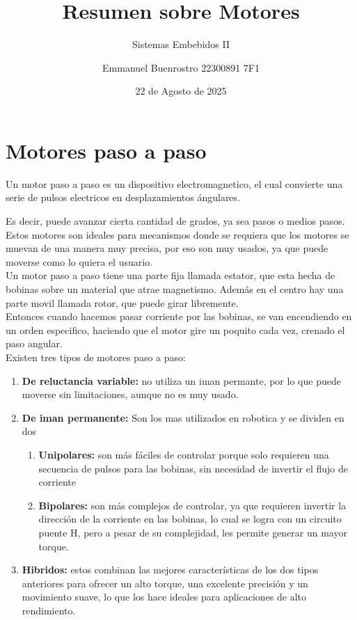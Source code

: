 \documentclass[11pt]{scrartcl}
\title {Resumen sobre Motores}
\subtitle{Sistemas Embebidos II}
\date{22 de Agosto de 2025}
\author{Emmanuel Buenrostro 22300891 7F1 }
\begin{document}
\maketitle


\section{Motores paso a paso}

Un motor paso a paso es un dispositivo electromagnetico, el cual convierte
una serie de pulsos electricos en desplazamientos ángulares. 

Es decir, puede avanzar cierta cantidad de grados, ya sea pasos o medios pasos. \\

Estos motores son ideales para mecanismos donde se requiera que los motores se muevan de una manera muy precisa, por eso son 
muy usados, ya que puede moverse como lo quiera el usuario. \\

Un motor paso a paso tiene una parte fija llamada estator, que esta hecha de bobinas sobre un material que atrae magnetismo. Además en el centro hay una parte movil llamada
rotor, que puede girar libremente. \\

Entonces cuando hacemos pasar corriente por las bobinas, se van encendiendo en un orden especifico, haciendo que el motor gire un poquito cada vez, crenado el paso angular. \\

Existen tres tipos de motores paso a paso: 
\begin{enumerate}
    \item \textbf{De reluctancia variable: } no utiliza un iman permante, por lo que puede moverse sin limitaciones, aunque no es muy usado. 
    \item \textbf{De iman permanente: } Son los mas utilizados en robotica y se dividen en dos 
        \begin{enumerate}
            \item \textbf{Unipolares: } son más fáciles de controlar porque solo requieren una secuencia de pulsos para las bobinas, sin necesidad de invertir el flujo de corriente
            \item \textbf{Bipolares: } son más complejos de controlar, ya que requieren invertir la dirección de la corriente en las bobinas, lo cual se logra con un circuito puente H, pero a pesar de su complejidad, les permite generar un mayor torque.
        \end{enumerate}
    \item \textbf{Hibridos: } estos combinan las mejores características de los dos tipos anteriores para ofrecer un alto torque, una excelente precisión y un movimiento suave, lo que los hace ideales para aplicaciones de alto rendimiento.
\end{enumerate}
\end{document}
